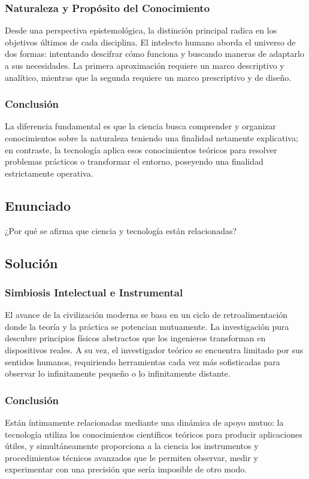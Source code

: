 \documentclass[12pt, a4paper]{article}
\begin{document}
\subsubsection*{Naturaleza y Propósito del Conocimiento}
Desde una perspectiva epistemológica, la distinción principal radica en los objetivos últimos de cada disciplina. El intelecto humano aborda el universo de dos formas: intentando descifrar cómo funciona y buscando maneras de adaptarlo a sus necesidades. La primera aproximación requiere un marco descriptivo y analítico, mientras que la segunda requiere un marco prescriptivo y de diseño.

\subsubsection*{Conclusión}
La diferencia fundamental es que la ciencia busca comprender y organizar conocimientos sobre la naturaleza teniendo una finalidad netamente explicativa; en contraste, la tecnología aplica esos conocimientos teóricos para resolver problemas prácticos o transformar el entorno, poseyendo una finalidad estrictamente operativa.

\newpage

\subsection*{Enunciado}
¿Por qué se afirma que ciencia y tecnología están relacionadas?

\subsection*{Solución}

\subsubsection*{Simbiosis Intelectual e Instrumental}
El avance de la civilización moderna se basa en un ciclo de retroalimentación donde la teoría y la práctica se potencian mutuamente. La investigación pura descubre principios físicos abstractos que los ingenieros transforman en dispositivos reales. A su vez, el investigador teórico se encuentra limitado por sus sentidos humanos, requiriendo herramientas cada vez más sofisticadas para observar lo infinitamente pequeño o lo infinitamente distante.

\subsubsection*{Conclusión}
Están íntimamente relacionadas mediante una dinámica de apoyo mutuo: la tecnología utiliza los conocimientos científicos teóricos para producir aplicaciones útiles, y simultáneamente proporciona a la ciencia los instrumentos y procedimientos técnicos avanzados que le permiten observar, medir y experimentar con una precisión que sería imposible de otro modo.
\end{document}
